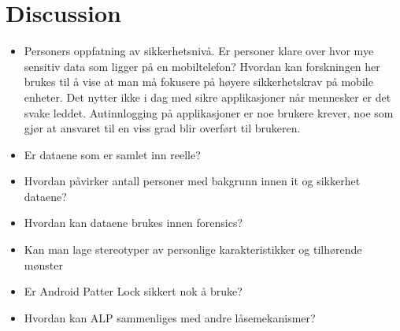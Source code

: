 \chapter{Discussion}\label{chap:discussion}

	\begin{itemize}
		\item Personers oppfatning av sikkerhetsnivå. Er personer klare over hvor mye sensitiv data som ligger på en mobiltelefon? Hvordan kan forskningen her brukes til å vise at man må fokusere på høyere sikkerhetskrav på mobile enheter. Det nytter ikke i dag med sikre applikasjoner når mennesker er det svake leddet. Autinnlogging på applikasjoner er noe brukere krever, noe som gjør at ansvaret til en viss grad blir overført til brukeren.
		\item Er dataene som er samlet inn reelle? 
		\item Hvordan påvirker antall personer med bakgrunn innen it og sikkerhet dataene?
		\item Hvordan kan dataene brukes innen forensics?
		\item Kan man lage stereotyper av personlige karakteristikker og tilhørende mønster
		\item Er Android Patter Lock sikkert nok å bruke?
		\item Hvordan kan ALP sammenliges med andre låsemekanismer?
	\end{itemize}